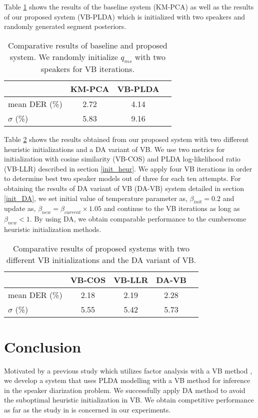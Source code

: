\documentclass{article}
\begin{document}
Table \ref{sys_comparison_base} shows the results of the baseline system (KM-PCA) as well as the results of our proposed system (VB-PLDA) which is initialized with two speakers and randomly generated segment posteriors. 

\begin{table}[h]\caption{Comparative results of baseline and proposed system. We randomly initialize $q_{ms}$ with two speakers for VB iterations.}\label{sys_comparison_base}
\centering
\begin{tabular}{|l|c|c|c|}
\hline
&KM-PCA&VB-PLDA\\ \hline
mean DER (\%) & 2.72 & 4.14  \\ \hline
$\sigma$ (\%)        & 5.83 & 9.16  \\ \hline
\end{tabular}
\end{table}
Table \ref{sys_comparison_init} shows the results obtained from our proposed system with two different heuristic initializations and a DA variant of VB. We use two metrics for initialization with cosine similarity (VB-COS) and PLDA log-likelihood ratio  (VB-LLR) described in section \ref{init_heur}. We apply four VB iterations in order to determine best two speaker models out of three for each ten attempts. For obtaining the results of DA variant of VB (DA-VB) system detailed in section \ref{init_DA}, we set initial value of temperature parameter as, $\beta_{init}=0.2$ and update as, $\beta_{new}=\beta_{current}\times1.05$ and continue to the VB iterations as long as $\beta_{new}<1$. By using DA, we obtain comparable performance to the cumbersome heuristic initialization methods.
\begin{table}[h]\caption{Comparative results of proposed systems with two different VB initializations and the DA variant of VB.}\label{sys_comparison_init}
\centering
\begin{tabular}{|l|c|c|c|c|}
\hline
&VB-COS&VB-LLR&DA-VB\\ \hline
mean DER (\%) & 2.18 & 2.19 & 2.28 \\ \hline
$\sigma$ (\%)        & 5.55 & 5.42 & 5.73 \\ \hline
\end{tabular}
\end{table}

\vspace{-0.1in}
\section{Conclusion}
\label{sec:conc}
Motivated by a previous study which utilizes factor analysis with a VB method \cite{kenny2010diarFA}, we develop a system that uses PLDA modelling with a VB method for inference in the speaker diarization problem. We successfully apply DA method to avoid the suboptimal heuristic initialization in VB. We obtain competitive performance as far as the study in \cite{shum2011intraconv} is concerned in our experiments.
\end{document}

